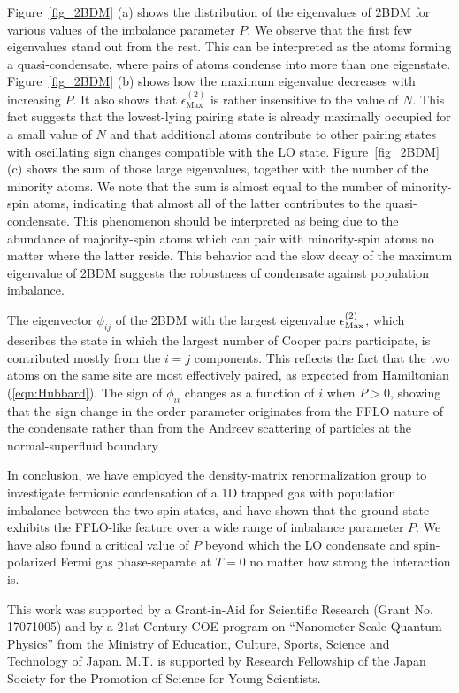 \documentclass[prl,twocolumn,superscriptaddress,showpacs,preprintnumbers,amsmath,amssymb]{revtex4}
\begin{document}
Figure~\ref{fig_2BDM} (a) shows the distribution of the eigenvalues
of 2BDM for various values of the imbalance parameter $P$.
We observe that the first few eigenvalues stand out from the rest.
This can be interpreted as the atoms forming a quasi-condensate,
where pairs of atoms condense into more than one eigenstate.
Figure~\ref{fig_2BDM} (b) shows how the maximum eigenvalue
decreases with increasing $P$.
It also shows that $\epsilon_\textrm{Max}^{(2)}$ is rather
insensitive to the value of $N$. This fact suggests that the lowest-lying
pairing state is already maximally occupied for a small value of $N$ and
that additional atoms contribute to other pairing states with oscillating
sign changes compatible with the LO state.
Figure~\ref{fig_2BDM} (c)
shows the sum of those large eigenvalues, together with the number
of the minority atoms.
We note that the sum is almost equal to the number of minority-spin atoms,
indicating that
almost all of the latter contributes to the quasi-condensate.
This phenomenon should be interpreted as being due to the abundance of majority-spin atoms
which can pair with minority-spin atoms no matter where the latter reside.
This behavior and the slow decay of the maximum eigenvalue of 2BDM
suggests the robustness of condensate against population imbalance.

The eigenvector $\phi_{ij}$ of the 2BDM with the largest eigenvalue
$\epsilon_{\rm Max}^{(2)}$, which describes the state in which
the largest number of Cooper pairs participate,
is contributed mostly from the $i=j$ components.
This reflects the fact that the two atoms on the same site are most 
effectively paired,
as expected from Hamiltonian (\ref{eqn:Hubbard}).
The sign of $\phi_{ii}$ changes as a function of $i$ when $P>0$,
showing that the sign change in the order parameter originates
from the FFLO nature of the condensate rather than from the Andreev
scattering of particles at the normal-superfluid boundary \cite{2007PhRvL..98q0402V}.

In conclusion, we have employed the density-matrix renormalization group
to investigate fermionic condensation of a 1D trapped gas with
population imbalance between the two spin states,
and have shown that the ground state exhibits the FFLO-like feature over
a wide range of imbalance parameter $P$.
We have also found a critical value of $P$ beyond which the LO condensate
and spin-polarized Fermi gas phase-separate at $T=0$ no matter
how strong the interaction is.

This work was supported by a Grant-in-Aid for Scientific
Research (Grant No. 17071005) and by a 21st Century COE program on ``Nanometer-Scale Quantum Physics''
from the Ministry of Education, Culture, Sports, Science
and Technology of Japan.
M.T. is supported by Research Fellowship
of the Japan Society for the Promotion of Science for Young Scientists.


\end{document}
